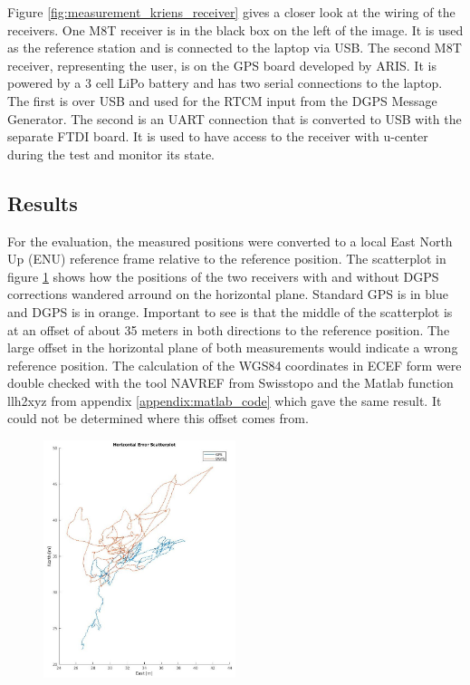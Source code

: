 Figure \ref{fig:measurement_kriens_receiver} gives a closer look at the wiring of the receivers.
One M8T receiver is in the black box on the left of the image.
It is used as the reference station and is connected to the laptop via USB.
The second M8T receiver, representing the user, is on the GPS board developed by ARIS.
It is powered by a 3 cell LiPo battery and has two serial connections to the laptop.
The first is over USB and used for the RTCM input from the DGPS Message Generator.
The second is an UART connection that is converted to USB with the separate FTDI board.
It is used to have access to the receiver with u-center during the test and monitor its state.

\subsection{Results}

For the evaluation, the measured positions were converted to a local East North Up (ENU) reference frame relative to the reference position.
The scatterplot in figure \ref{fig:scatterplot} shows how the positions of the two receivers with and without DGPS corrections wandered arround on the horizontal plane.
Standard GPS is in blue and DGPS is in orange.
Important to see is that the middle of the scatterplot is at an offset of about 35 meters in both directions to the reference position.
The large offset in the horizontal plane of both measurements would indicate a wrong reference position.
The calculation of the WGS84 coordinates in ECEF form were double checked with the tool NAVREF from Swisstopo and the Matlab function llh2xyz from appendix \ref{appendix:matlab_code} which gave the same result.
It could not be determined where this offset comes from.

\begin{figure}
  \centering
 \includegraphics[width=0.5\textwidth]{images/Scatterplot.jpg}
 \label{fig:scatterplot}
\end{figure}

